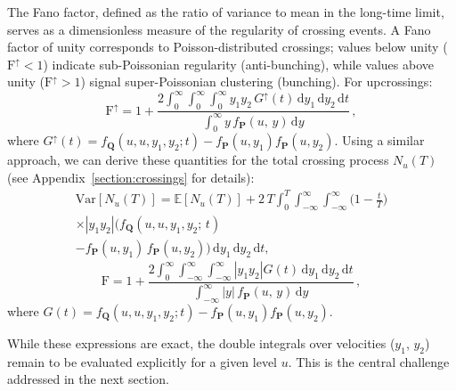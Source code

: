 \documentclass[journal]{IEEEtran}
\theoremstyle{plain}
\theoremstyle{definition}
\theoremstyle{remark}
\newcommand{\E}{\mathbb{E}}
\newcommand{\FF}{\mathrm{F}}
\newcommand{\FFup}{\mathrm{F}^\uparrow}
\newcommand{\Nu}{N_u(T)}
\newcommand{\dd}{\mathrm{d}}
\newcommand{\Var}{\text{Var}}
\begin{document}
The Fano factor, defined as the ratio of variance to mean in the long-time limit, serves as a dimensionless measure of the regularity of crossing events. A Fano factor of unity corresponds to Poisson-distributed crossings; values below unity ($\FFup < 1$) indicate sub-Poissonian regularity (anti-bunching), while values above unity ($\FFup > 1$) signal super-Poissonian clustering (bunching). For upcrossings:
\begin{equation}
    \FFup = 1 + \frac{2\displaystyle\int_{0}^\infty \!\!\int_{0}^\infty \!\!\int_{0}^\infty y_1 y_2 \,G^\uparrow(t)\, \dd y_1 \, \dd y_2 \, \dd t}{\displaystyle\int_{0}^\infty y\, f_{\mathbf{P}}(u,\,y) \, \dd y}\, , \label{eq:fano_factor_upcrossing_1_main}
\end{equation}
where $G^\uparrow(t) = f_{\mathbf{Q}}(u, u, y_1, y_2; t) - f_{\mathbf{P}}(u,y_1) f_{\mathbf{P}}(u,y_2)$.
Using a similar approach, we can derive these quantities for the total crossing process $\Nu$ (see Appendix~\ref{section:crossings} for details):
\begin{multline}
    \Var[\Nu] = \E\left[\Nu\right] + 2 \,T \int_{0}^T \!\!\int_{-\infty}^\infty \!\!\int_{-\infty}^\infty \biggl(1-\frac{t}{T}\biggr) \\
    \times \left|y_1 y_2 \right|\bigl( f_{\mathbf{Q}}(u, u, y_1, y_2; \, t) \\
    - f_{\mathbf{P}}(u,y_1) \, f_{\mathbf{P}}(u,y_2)\bigr)\, \dd y_1 \, \dd y_2 \, \dd t,
\end{multline}
\begin{equation}
    \FF = 1 + \frac{2\displaystyle\int_{0}^\infty \!\!\int_{-\infty}^\infty \!\!\int_{-\infty}^\infty \left|y_1 y_2 \right| G(t)\, \dd y_1 \, \dd y_2 \, \dd t}{\displaystyle\int_{-\infty}^\infty |y|\, f_{\mathbf{P}}(u,\,y) \, \dd y}\, , \label{eq:fano_factor_upcrossing_1_main_cross}
\end{equation}
where $G(t) = f_{\mathbf{Q}}(u, u, y_1, y_2; t) - f_{\mathbf{P}}(u,y_1) f_{\mathbf{P}}(u,y_2)$.

While these expressions are exact, the double integrals over velocities ($y_1$, $y_2$) remain to be evaluated explicitly for a given level $u$. This is the central challenge addressed in the next section.
\end{document}
